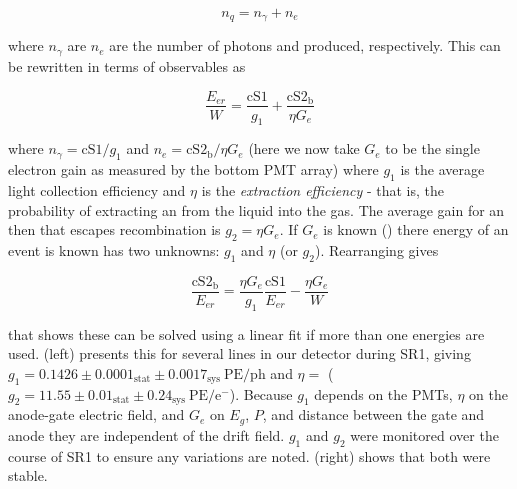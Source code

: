 \begin{equation}
n_q = n_{\gamma} + n_e
\end{equation}

\noindent where $n_{\gamma}$ are $n_e$ are the number of photons and \electron produced, respectively.  This can be rewritten in terms of
observables as

\begin{equation}
\frac{E_{er}}{W} = \frac{\mathrm{cS1}}{g_1} + \frac{\mathrm{cS2_b}}{\eta G_e}
\label{eq:calibrations_s1_s2}
\end{equation}

\noindent where $n_{\gamma} = \mathrm{cS1} / g_1$ and $n_e = \mathrm{cS2_b} / \eta G_e$ (here we now take $G_e$ to be the single electron
gain as measured by the bottom PMT array) where $g_1$ is the average light collection
efficiency and $\eta$
is the \textit{extraction efficiency} - that is, the probability of extracting an \electron from the liquid into the gas.  The average
gain for an \electron then that escapes recombination is $g_2 = \eta G_e$.  If $G_e$ is known
() there energy of an event is known  has two unknowns:
$g_1$ and $\eta$ (or $g_2$).  Rearranging gives

\begin{equation}
\frac{\mathrm{cS2_b}}{E_{er}} = \frac{\eta G_e}{g_1} \frac{\mathrm{cS1}}{E_{er}} - \frac{\eta G_e}{W}
\end{equation}

\noindent that shows these can be solved using a linear fit if more than one energies are
used.   (left) presents this for several lines in our detector during SR1, giving
$g_1 = 0.1426 \pm 0.0001_{\mathrm{stat}} \pm 0.0017_{\mathrm{sys}}\ \mathrm{PE/ph}$ and $\eta = $
($g_2 = 11.55 \pm 0.01_{\mathrm{stat}} \pm 0.24_{\mathrm{sys}}\ \mathrm{PE/e^-}$).  Because $g_1$ depends on the PMTs, $\eta$ on the anode-gate electric field, and $G_e$ on
$E_g$, $P$, and distance between the gate and anode they are independent of the drift field.  $g_1$ and $g_2$ were monitored over the
course of SR1 to ensure any variations are noted.   (right) shows that both
were stable.

